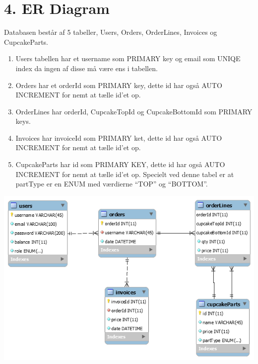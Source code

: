 \documentclass[11pt]{report}
\begin{document}
\chapter*{4. ER Diagram}
Databasen består af 5 tabeller, Users, Orders, OrderLines, Invoices og CupcakeParts.
\begin{enumerate}
  \item Users tabellen har et username som PRIMARY key og email som
    UNIQE index da ingen af disse må være ens i tabellen.
  \item Orders har et orderId som PRIMARY key, dette id har også AUTO
    INCREMENT for nemt at tælle id’et op.
  \item OrderLines har orderId, CupcakeTopId og CupcakeBottomId som PRIMARY keys.
  \item Invoices har invoiceId som PRIMARY ket, dette id har også AUTO
    INCREMENT for nemt at tælle id’et op.
  \item CupcakeParts har id som PRIMARY KEY, dette id har også AUTO
    INCREMENT for nemt at tælle id’et op. Specielt ved denne tabel er
    at partType er en ENUM med værdierne “TOP” og “BOTTOM”.
\end{enumerate}
\begin{center}
\includegraphics[width=15cm]{Er.png}
\end{center}
\newpage
\end{document}
